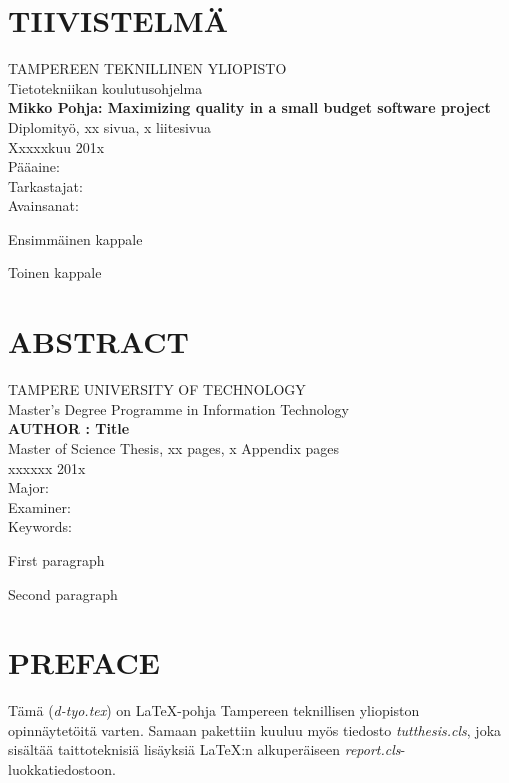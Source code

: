 \newpage
 
\setcounter{page}{1} %
 
\chapter*{TIIVISTELMÄ}
\begin{spacing}{1.0}
\textsf{TAMPEREEN TEKNILLINEN YLIOPISTO}\\
\textsf{Tietotekniikan koulutusohjelma}\\
{\bf \textsf{Mikko Pohja: Maximizing quality in a small budget software project}}\\
\textsf{Diplomityö, xx sivua, x liitesivua}\\
\textsf{Xxxxxkuu 201x}\\
\textsf{Pääaine: }\\
\textsf{Tarkastajat: }\\
\textsf{Avainsanat: }\\
\end{spacing}
 
\noindent
Ensimmäinen kappale
 
\noindent
Toinen kappale
\newpage
\chapter*{ABSTRACT}
\begin{spacing}{1.0}
\textsf{TAMPERE UNIVERSITY OF TECHNOLOGY}\\
\textsf{Master's Degree Programme in Information Technology}\\
{\bf \textsf{AUTHOR : Title}}\\
\textsf{Master of Science Thesis, xx pages, x Appendix pages}\\
\textsf{xxxxxx 201x}\\
\textsf{Major: }\\
\textsf{Examiner: }\\
\textsf{Keywords: }\\
\end{spacing}
 
\noindent 
First paragraph
 
\noindent
Second paragraph
 
\newpage
 
\chapter*{PREFACE}
\noindent Tämä (\textit{d-tyo.tex}) on \LaTeX-pohja Tampereen teknillisen
yliopiston opinnäytetöitä varten. Samaan pakettiin kuuluu myös
tiedosto \mbox{\textit{tutthesis.cls}}, joka sisältää taittoteknisiä
lisäyksiä \LaTeX:n alkuperäiseen \textit{report.cls}-luokkatiedostoon.
 
